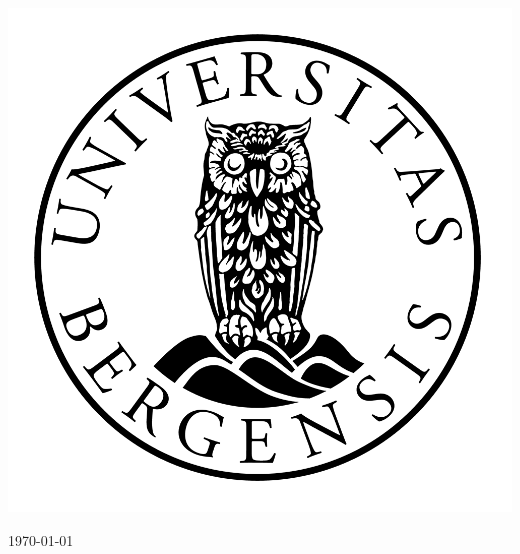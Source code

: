 \begin{titlepage}
\centerline{\includegraphics[scale=0.15]{figures/canvas}}  %


{\large \monthyeardate\today}\\[3cm] %


\vfill %

\end{titlepage}
